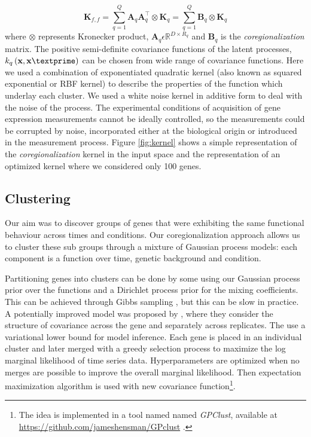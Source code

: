 \begin{equation} \label{eq:LMCcovK}
\textbf{K}_{f,f}=\sum\limits_{q=1}^Q \textbf{A}_q\textbf{A}^{\top}_q \otimes \textbf{K}_q
=\sum\limits_{q=1}^Q \textbf{B}_q \otimes \textbf{K}_q
\end{equation}
where $\otimes$ represents Kronecker product, $\textbf{A}_q \epsilon \mathbb{R}^{D\times R_q}$ and $\textbf{B}_q$ is the \emph{coregionalization} matrix. The positive semi-definite covariance functions
of the latent processes, $k_q\left(\textbf{x},\textbf{x}\textprime\right)$ can be chosen from wide range of covariance functions. Here we used a combination of exponentiated quadratic kernel (also known as squared exponential or RBF kernel) to describe the properties of the function which underlay each cluster. We used a white noise kernel in additive form to deal with the noise of the process. The experimental conditions of acquisition of gene expression measurements cannot be ideally controlled, so the measurements could be corrupted by noise, incorporated either at the biological origin or introduced in the measurement process. Figure \ref{fig:kernel} shows a simple representation of the \emph{coregionalization} kernel in the input space and the representation of an optimized kernel where we considered only 100 genes.

\subsection{Clustering}
Our aim was to discover groups of genes that were exhibiting the same functional behaviour across times and conditions. Our coregionalization approach allows us to cluster these sub groups through a mixture of Gaussian process models: each component is a function over time, genetic background and condition.

Partitioning genes into clusters can be done by some using our Gaussian process prior over the functions and a Dirichlet process prior for the mixing coefficients. This can be achieved through Gibbs sampling \cite{Dunson:2010}, but this can be slow in practice. A potentially improved model was proposed by \cite{Hensman:2013}, where they consider the structure of covariance across the gene and separately across replicates. The use a variational lower bound for model inference. Each gene is placed in an individual cluster and later merged with a greedy selection process to maximize the log marginal likelihood of time series data. Hyperparameters are optimized when no merges are possible to improve the overall marginal likelihood. Then expectation maximization algorithm is used with new covariance function\footnote{The idea is implemented in a tool named named \emph{GPClust}, available at \url{https://github.com/jameshensman/GPclust} \cite{Hensman:2013}.}.

